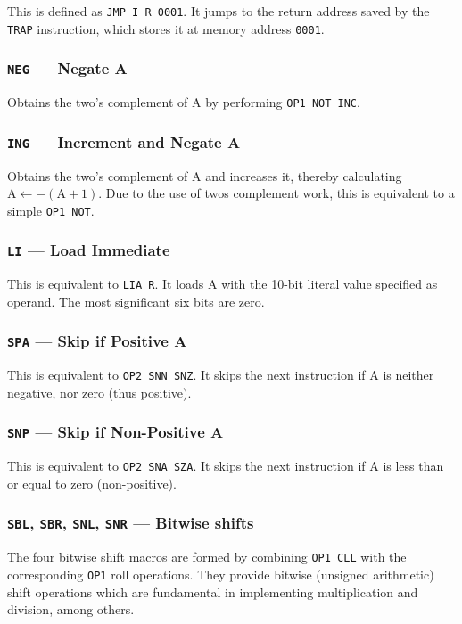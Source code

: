 \documentclass[11pt,a4paper,twocolumns]{article}
\begin{document}
This is defined as {\tt JMP I R 0001}. It jumps to the return address
saved by the {\tt TRAP} instruction, which stores it at memory address
{\tt 0001}.

\subsubsection{{\tt NEG} — Negate A}

Obtains the two's complement of A by performing {\tt OP1 NOT INC}.

\subsubsection{{\tt ING} — Increment and Negate A}

Obtains the two's complement of A and increases it, thereby
calculating $\mbox{A} \leftarrow -(\mbox{A} + 1)$. Due to the use of
twos complement work, this is equivalent to a simple {\tt OP1 NOT}.

\subsubsection{{\tt LI} — Load Immediate}

This is equivalent to {\tt LIA R}. It loads A with the 10-bit literal
value specified as operand. The most significant six bits are zero.

\subsubsection{{\tt SPA} — Skip if Positive A}

This is equivalent to {\tt OP2 SNN SNZ}. It skips the next instruction
if A is neither negative, nor zero (thus positive).

\subsubsection{{\tt SNP} — Skip if Non-Positive A}

This is equivalent to {\tt OP2 SNA SZA}. It skips the next instruction
if A is less than or equal to zero (non-positive).

\subsubsection{{\tt SBL}, {\tt SBR}, {\tt SNL}, {\tt SNR} — Bitwise shifts}

The four bitwise shift macros are formed by combining {\tt OP1 CLL} with
the corresponding {\tt OP1} roll operations. They provide bitwise
(unsigned arithmetic) shift operations which are fundamental in
implementing multiplication and division, among others.
\end{document}

